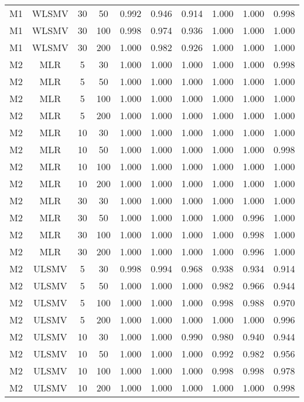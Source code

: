 {\begin{longtable}[!tbp]{@{\extracolsep{\fill}}lccccccccc}
  M1 & WLSMV & 30 & 50 & 0.992 & 0.946 & 0.914 & 1.000 & 1.000 & 0.998 \\ 
  M1 & WLSMV & 30 & 100 & 0.998 & 0.974 & 0.936 & 1.000 & 1.000 & 1.000 \\ 
  M1 & WLSMV & 30 & 200 & 1.000 & 0.982 & 0.926 & 1.000 & 1.000 & 1.000 \\ 
  M2 & MLR & 5 & 30 & 1.000 & 1.000 & 1.000 & 1.000 & 1.000 & 0.998 \\ 
  M2 & MLR & 5 & 50 & 1.000 & 1.000 & 1.000 & 1.000 & 1.000 & 1.000 \\ 
  M2 & MLR & 5 & 100 & 1.000 & 1.000 & 1.000 & 1.000 & 1.000 & 1.000 \\ 
  M2 & MLR & 5 & 200 & 1.000 & 1.000 & 1.000 & 1.000 & 1.000 & 1.000 \\ 
  M2 & MLR & 10 & 30 & 1.000 & 1.000 & 1.000 & 1.000 & 1.000 & 1.000 \\ 
  M2 & MLR & 10 & 50 & 1.000 & 1.000 & 1.000 & 1.000 & 1.000 & 0.998 \\ 
  M2 & MLR & 10 & 100 & 1.000 & 1.000 & 1.000 & 1.000 & 1.000 & 1.000 \\ 
  M2 & MLR & 10 & 200 & 1.000 & 1.000 & 1.000 & 1.000 & 1.000 & 1.000 \\ 
  M2 & MLR & 30 & 30 & 1.000 & 1.000 & 1.000 & 1.000 & 1.000 & 1.000 \\ 
  M2 & MLR & 30 & 50 & 1.000 & 1.000 & 1.000 & 1.000 & 0.996 & 1.000 \\ 
  M2 & MLR & 30 & 100 & 1.000 & 1.000 & 1.000 & 1.000 & 0.998 & 1.000 \\ 
  M2 & MLR & 30 & 200 & 1.000 & 1.000 & 1.000 & 1.000 & 0.996 & 1.000 \\ 
  M2 & ULSMV & 5 & 30 & 0.998 & 0.994 & 0.968 & 0.938 & 0.934 & 0.914 \\ 
  M2 & ULSMV & 5 & 50 & 1.000 & 1.000 & 1.000 & 0.982 & 0.966 & 0.944 \\ 
  M2 & ULSMV & 5 & 100 & 1.000 & 1.000 & 1.000 & 0.998 & 0.988 & 0.970 \\ 
  M2 & ULSMV & 5 & 200 & 1.000 & 1.000 & 1.000 & 1.000 & 1.000 & 0.996 \\ 
  M2 & ULSMV & 10 & 30 & 1.000 & 1.000 & 0.990 & 0.980 & 0.940 & 0.944 \\ 
  M2 & ULSMV & 10 & 50 & 1.000 & 1.000 & 1.000 & 0.992 & 0.982 & 0.956 \\ 
  M2 & ULSMV & 10 & 100 & 1.000 & 1.000 & 1.000 & 0.998 & 0.998 & 0.978 \\ 
  M2 & ULSMV & 10 & 200 & 1.000 & 1.000 & 1.000 & 1.000 & 1.000 & 0.998 \\ 

\end{longtable}}
